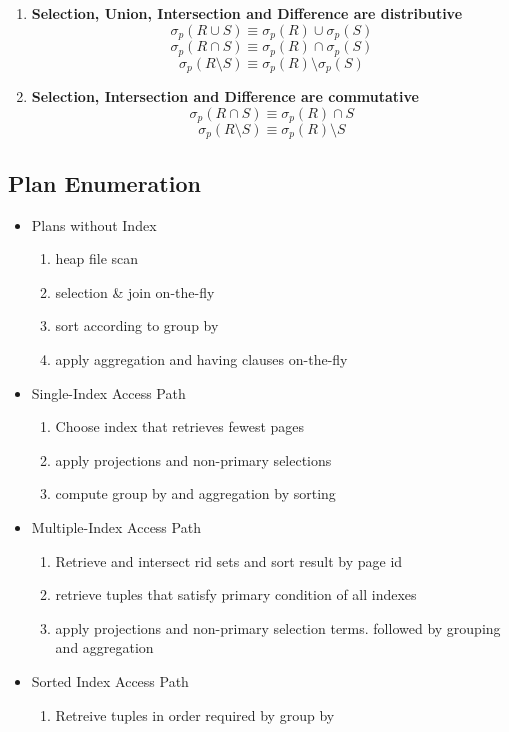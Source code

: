 \documentclass[a4paper]{article}
\begin{document}
\begin{twocolumn}
\begin{enumerate}
	\item \textbf{Selection, Union, Intersection and Difference are distributive}
	\[ \sigma_{p}(R \cup S) \equiv \sigma_{p}(R) \cup \sigma_{p}(S) \] 
	\[ \sigma_{p}(R \cap S) \equiv \sigma_{p}(R) \cap \sigma_{p}(S) \] 
	\[ \sigma_{p}(R \setminus S) \equiv \sigma_{p}(R) \setminus \sigma_{p}(S) \] 
	
	\item \textbf{Selection, Intersection and Difference are commutative}
	\[ \sigma_{p}(R \cap S) \equiv \sigma_p(R) \cap S \] 
	\[ \sigma_{p}(R \setminus S) \equiv \sigma_p(R) \setminus S \] 
\end{enumerate}


\subsection{Plan Enumeration}
\begin{itemize}
	\item Plans without Index
	\begin{enumerate}
		\item heap file scan
		\item selection \& join on-the-fly
		\item sort according to group by
		\item apply aggregation and having clauses on-the-fly
	\end{enumerate}
	\item Single-Index Access Path
	\begin{enumerate}
		\item Choose index that retrieves fewest pages
		\item apply projections and non-primary selections
		\item compute group by and aggregation by sorting
	\end{enumerate}
	\item Multiple-Index Access Path
	\begin{enumerate}
		\item Retrieve and intersect rid sets and sort result by page id
		\item retrieve tuples that satisfy primary condition of all indexes
		\item apply projections and non-primary selection terms. followed by grouping and aggregation
	\end{enumerate}
	\item Sorted Index Access Path
	\begin{enumerate}
		\item Retreive tuples in order required by group by

\end{enumerate}
\end{itemize}
\end{twocolumn}
\end{document}
